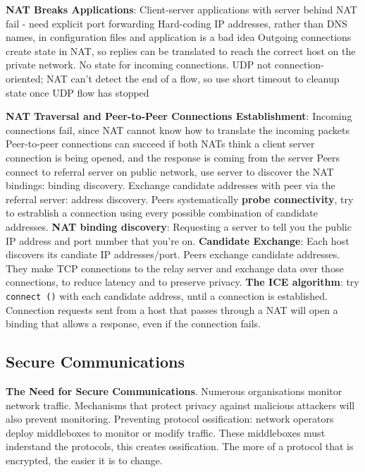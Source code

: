 \documentclass{article}
\begin{document}
\vspace{\baselineskip}
\textbf{NAT Breaks Applications}:
Client-server applications with server behind NAT fail {-} need explicit port forwarding
Hard-coding IP addresses, rather than DNS names, in configuration files and application is a bad idea
Outgoing connections create state in NAT, so replies can be translated to reach the correct host on the private network.
No state for incoming connections.
UDP not connection-oriented; NAT can't detect the end of a flow, so use short timeout to cleanup state once UDP flow has stopped

\vspace{\baselineskip}
\textbf{NAT Traversal and Peer-to-Peer Connections Establishment}:
Incoming connections fail, since NAT cannot know how to translate the incoming packets
Peer-to-peer connections can succeed if both NATs think a client server connection is being opened, and the response is coming from the server
Peers connect to referral server on public network, use server to discover the NAT bindings: binding discovery.
Exchange candidate addresses with peer via the referral server: address discovery.
Peers systematically \textbf{probe connectivity}, try to estrablish a connection using every possible combination of candidate addresses.
\textbf{NAT binding discovery}: Requesting a server to tell you the public IP address and port number that you're on.
\textbf{Candidate Exchange}: Each host discovers its candiate IP addresses/port. Peers exchange candidate addresses.
They make TCP connections to the relay server and exchange data over those connections, to reduce latency and to preserve privacy.
\textbf{The ICE algorithm}: try \texttt{connect ()} with each candidate address, until a connection is established.
Connection requests sent from a host that passes through a NAT will open a binding that allows a response, even if the connection fails.

\clearpage

\subsection*{Secure Communications}

\textbf{The Need for Secure Communications}. Numerous organisations monitor network traffic.
Mechanisms that protect privacy against malicious attackers will also prevent monitoring.
Preventing protocol ossification: network operators deploy middleboxes to monitor or modify traffic.
These middleboxes must inderstand the protocols, this creates ossification.
The more of a protocol that is encrypted, the easier it is to change.
\end{document}
